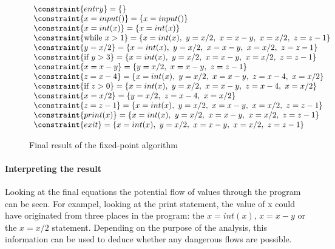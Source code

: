 \begin{figure}[H]
\[
\begin{array}{l}
  \constraint{entry} = \{\}\\
  \constraint{x = input()} = \{x = input()\}\\
  \constraint{x = int(x)} = \{x = int(x)\}\\
  \constraint{\text{while } x > 1} = \{ x = int(x), ~ y = x / 2, ~ x=x-y, ~ x = x/2, ~ z=z-1 \}\\
  \constraint{ y = x / 2} =  \{ x = int(x), ~ y = x / 2, ~ x=x-y, ~ x = x/2, ~ z=z-1 \}\\
  \constraint{\text{if } y > 3} =  \{ x = int(x), ~ y = x / 2, ~ x=x-y, ~ x = x/2, ~ z=z-1 \}\\
  \constraint{ x = x-y} =  \{ y = x / 2, ~ x=x-y, ~ z=z-1 \}\\
  \constraint{ z = x-4} =  \{ x = int(x), ~ y = x / 2, ~ x=x-y, ~ z=x-4, ~ x = x/2\}\\
  \constraint{\text{if } z > 0} = \{ x = int(x), ~ y = x / 2, ~ x=x-y, ~ z=x-4, ~ x = x/2\}\\
  \constraint{x = x / 2} = \{ y = x / 2, ~ z=x-4, ~ x = x/2\}\\
  \constraint{z = z - 1} = \{ x = int(x), ~ y = x / 2, ~ x=x-y, ~ x = x/2, ~ z=z-1 \}\\
  \constraint{print(x)} = \{ x = int(x), ~ y = x / 2, ~ x=x-y, ~ x = x/2, ~ z=z-1 \}\\
  \constraint{exit} = \{ x = int(x), ~ y = x / 2, ~ x=x-y, ~ x = x/2, ~ z=z-1 \}\\
\end{array}
\]
\caption{Final result of the fixed-point algorithm}
\label{reachingdefinitions:finaliteration}
\end{figure}

\paragraph{Interpreting the result}

Looking at the final equations the potential flow of values through the program can be seen.
For exampel, looking at the print statement, the value of x could have originated from three places in the program: the $x = int(x)$, $x = x-y$ or the $x = x/2$ statement.
Depending on the purpose of the analysis, this information can be used to deduce whether any dangerous flows are possible.
